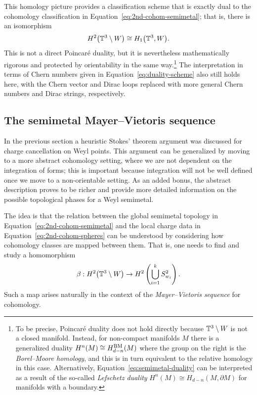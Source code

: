 This homology picture provides a classification scheme that is exactly dual to the cohomology classification in Equation~\eqref{eq:2nd-cohom-semimetal}; that is, there is an isomorphism
\begin{equation}\label{eq:semimetal-duality}
	H^2\big(\mathbb{T}^3\setminus W\big) \cong H_1\big(\mathbb{T}^3, W\big).
\end{equation}
This is not a direct Poincar\'e duality, but it is nevertheless mathematically rigorous and protected by orientability in the same way.\footnote{
	To be precise, Poincar\'e duality does not hold directly because $\mathbb{T}^3\setminus W$ is not a closed manifold. Instead, for non-compact manifolds $M$ there is a generalized duality $H^n(M)\cong H_{d-n}^{\rm BM}(M)$ where the group on the right is the \emph{Borel--Moore homology}, and this is in turn equivalent to the relative homology in this case. Alternatively, Equation~\eqref{eq:semimetal-duality} can be interpreted as a result of the so-called \emph{Lefschetz duality} $H^n(M)\cong H_{d-n}(M, \partial M)$ for manifolds with a boundary.}
The interpretation in terms of Chern numbers given in Equation~\eqref{eq:duality-scheme} also still holds here, with the Chern vector and Dirac loops replaced with more general Chern numbers and Dirac strings, respectively.


\subsection{The semimetal Mayer--Vietoris sequence}\label{sec:Mayer-Vietoris}

In the previous section a heuristic Stokes' theorem argument was discussed for charge cancellation on Weyl points. This argument can be generalized by moving to a more abstract cohomology setting, where we are not dependent on the integration of forms; this is important because integration will not be well defined once we move to a non-orientable setting. As an added bonus, the abstract description proves to be richer and provide more detailed information on the possible topological phases for a Weyl semimetal.

The idea is that the relation between the global semimetal topology in Equation~\eqref{eq:2nd-cohom-semimetal} and the local charge data in Equation~\eqref{eq:2nd-cohom-spheres} can be understood by considering how cohomology classes are mapped between them. That is, one needs to find and study a homomorphism
\begin{equation*}
	\beta: H^2\big(\mathbb{T}^3\setminus W\big) \to H^2\left(\bigcup_{i=1}^k S_{w_i}^2\right).
\end{equation*}
Such a map arises naturally in the context of the \emph{Mayer--Vietoris sequence} for cohomology.

